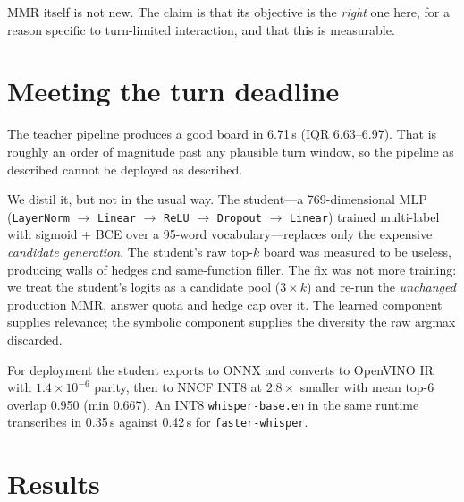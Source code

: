 \documentclass{article}
\begin{document}
MMR itself is not new. The claim is that its objective is the \emph{right} one
here, for a reason specific to turn-limited interaction, and that this is
measurable.

\section{Meeting the turn deadline}

The teacher pipeline produces a good board in 6.71\,s (IQR 6.63--6.97). That is
roughly an order of magnitude past any plausible turn window, so the pipeline as
described cannot be deployed as described.

We distil it, but not in the usual way. The student---a 769-dimensional MLP
(\texttt{LayerNorm} $\rightarrow$ \texttt{Linear} $\rightarrow$ \texttt{ReLU}
$\rightarrow$ \texttt{Dropout} $\rightarrow$ \texttt{Linear}) trained multi-label
with sigmoid + BCE over a 95-word vocabulary---replaces only the expensive
\emph{candidate generation}. The student's raw top-$k$ board was measured to be
useless, producing walls of hedges and same-function filler. The fix was not more
training: we treat the student's logits as a candidate pool
($3 \times k$) and re-run the \emph{unchanged} production MMR, answer quota and
hedge cap over it. The learned component supplies relevance; the symbolic
component supplies the diversity the raw argmax discarded.

For deployment the student exports to ONNX and converts to OpenVINO IR with
$1.4\times10^{-6}$ parity, then to NNCF INT8 at $2.8\times$ smaller with mean
top-6 overlap 0.950 (min 0.667). An INT8 \texttt{whisper-base.en} in the same
runtime transcribes in 0.35\,s against 0.42\,s for \texttt{faster-whisper}.

\section{Results}\label{sec:results}
\end{document}
